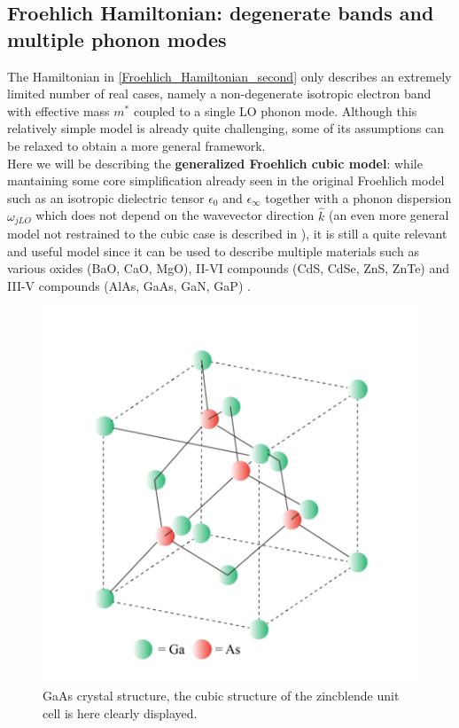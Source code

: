 \subsection{Froehlich Hamiltonian: degenerate bands and multiple phonon modes}
The Hamiltonian in \ref{Froehlich_Hamiltonian_second} only describes an extremely limited number of real cases, namely a non-degenerate 
isotropic electron band with effective mass $m^*$ coupled to a single LO phonon mode. Although this relatively simple model is already 
quite challenging, some of its assumptions can be relaxed to obtain a more general framework.\\
Here we will be describing the \textbf{generalized Froehlich cubic model}: while mantaining some core simplification already seen in the 
original Froehlich model such as an isotropic dielectric tensor $\epsilon_0$ and $\epsilon_\infty$ together with a phonon dispersion $\omega_{jLO}$ which 
does not depend on the wavevector direction $\hat{k}$ (an even more general model not restrained to the cubic case is described in \cite{miglio2020predominance}), it is still a quite relevant and useful model since 
it can be used to describe multiple materials such as various oxides (BaO, CaO, MgO), II-VI compounds (CdS, CdSe, ZnS, ZnTe) and 
III-V compounds (AlAs, GaAs, GaN, GaP) \cite{guster2021frohlich}.
\begin{figure}[H]
    \centering
    \includegraphics[scale=0.5]{GaAs_zincblende.png}
    \caption{GaAs crystal structure, the cubic structure of the zincblende unit cell is here clearly displayed.}
    \label{fig:GaAs_zincblende}
\end{figure}
